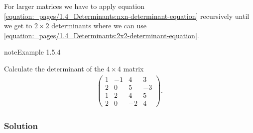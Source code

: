 \documentclass[letterpaper,10pt,english]{jupyterBook}
\begin{document}
\sphinxAtStartPar
For larger matrices we have to apply equation \eqref{equation:_pages/1.4_Determinants:nxn-determinant-equation} recursively until we get to \(2 \times 2\) determinants where we can use \eqref{equation:_pages/1.4_Determinants:2x2-determinant-equation}.
\label{_pages/1.4_Determinants:4x4-determinant-example}
\begin{sphinxadmonition}{note}{Example 1.5.4}



\sphinxAtStartPar
Calculate the determinant of the \(4 \times 4\) matrix
\begin{equation*}
\begin{split} \begin{pmatrix} 1 & -1 & 4 & 3 \\ 2 & 0 & 5 & -3 \\ 1 & 2 & 4 & 5 \\ 2 & 0 & -2 & 4 \end{pmatrix}. \end{split}
\end{equation*}\subsubsection*{Solution}


\end{sphinxadmonition}
\end{document}
